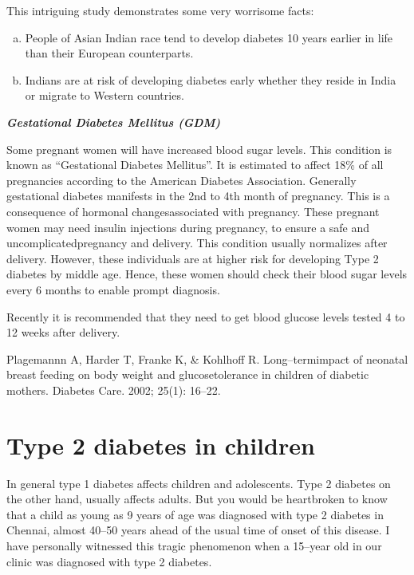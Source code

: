 This intriguing study demonstrates some very worrisome facts:

\begin{enumerate}[a)]
\itemsep=0pt
\item People of Asian Indian race tend to develop diabetes 10 years earlier in life than their European counterparts.
\item Indians are at risk of developing diabetes early whether they reside in India or migrate to Western countries.
\end{enumerate}

\setlength{\parskip}{.2em}
\noindent
\textbf{\textit{Gestational Diabetes Mellitus (GDM)}}

Some pregnant women will have increased blood sugar levels. This condition is known as “Gestational Diabetes Mellitus”. It is estimated to affect 18\% of all pregnancies according to the American Diabetes Association. Generally gestational diabetes manifests in the 2nd to 4th month of pregnancy. This is a consequence of hormonal changes\break associated with pregnancy. These pregnant women may need insulin injections during pregnancy, to ensure a safe and uncomplicated\break pregnancy and delivery. This condition usually normalizes after deli\-very. However, these individuals are at higher risk for developing Type 2 diabetes by middle age. Hence, these women should check their blood sugar levels every 6 months to enable prompt diagnosis.

Recently it is recommended that they need to get blood glucose levels tested 4 to 12 weeks after delivery.

\setlength{\parskip}{.2em}
\begin{thebibliography}{99}
 Plagemannn A, Harder T, Franke K, \& Kohlhoff R. Long–term\break impact of neonatal breast feeding on body weight and glucose\break tolerance in children of diabetic mothers. Diabetes Care. 2002; 25(1): 16–22.
\end{thebibliography}


\chapter{Type 2 diabetes in children}\label{chap7}

In general type 1 diabetes affects children and adolescents. Type 2 diabetes on the other hand, usually affects adults. But you would be heartbroken to know that a child as young as 9 years of age was diagnosed with type 2 diabetes in Chennai, almost 40–50 years ahead of the usual time of onset of this disease. I have personally witnessed this tragic phenomenon when a 15–year old in our clinic was diagnosed with type 2 diabetes.


